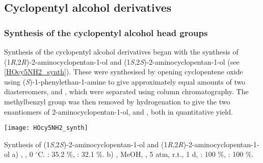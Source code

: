 \subsection{Cyclopentyl alcohol derivatives}

\subsubsection{Synthesis of the cyclopentyl alcohol head groups }

Synthesis of the cyclopentyl alcohol derivatives began with the synthesis of (1\textit{R},2\textit{R})-2-aminocyclopentan-1-ol  and (1\textit{S},2\textit{S})-2-aminocyclopentan-1-ol  (see \ref{HOcy5NH2_synth}).
These were synthesised by opening cyclopentene  oxide using (\textit{S})-1-phenylethan-1-amine  to give approximately equal amounts of two diastereomers,  and , which were separated using column chromatography\cite{Aube1992,Overman1985,Overman1985a}. 
The methylbenzyl group was then removed by hydrogenation to give the two enantiomers of 2-aminocyclopentan-1-ol,  and , both in quantitative yield.

\begin{scheme}[H]
	\begin{center}
		\texttt{[image: HOcy5NH2\_synth]}
		\caption{Synthesis of (1\textit{S},2\textit{S})-2-aminocyclopentan-1-ol  and (1\textit{R},2\textit{R})-2-aminocyclopentan-1-ol 
		a) , , 0 $^\circ$C.   : 35.2 \%,
		 : 32.1 \%.
		b) , MeOH, , 5 atm, r.t., 1 d,  : 100 \%,  : 100 \%.
		\label{sch:HOcy5NH2_synth}}
	\end{center}
\end{scheme}


